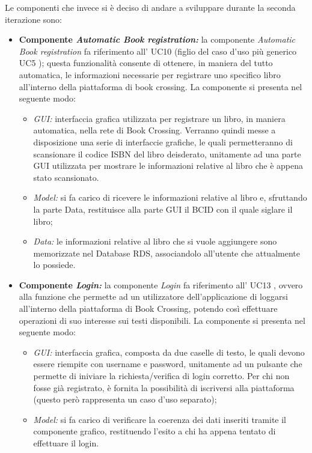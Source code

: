 Le componenti che invece si è deciso di andare a sviluppare durante la seconda iterazione sono: 
\begin{itemize}
	\item \textbf{Componente \textit{Automatic Book registration:}} la componente \textit{Automatic Book registration} fa riferimento all’ UC10
	(figlio del caso d'uso più generico UC5 
	); questa funzionalità consente di ottenere, in maniera del tutto automatica, le informazioni necessarie per registrare uno specifico libro all'interno della piattaforma di book crossing. La componente si presenta nel seguente modo:
	\begin{itemize}
		\item \textit{GUI:} interfaccia grafica utilizzata per registrare un libro, in maniera automatica, nella rete di Book Crossing. Verranno quindi messe a disposizione una serie di interfaccie grafiche, le quali permetteranno di scansionare il codice ISBN del libro deisderato, unitamente ad una parte GUI utilizzata per mostrare le informazioni relative al libro che è appena stato scansionato.
		\item \textit{Model:} si fa carico di ricevere le informazioni relative al libro e, sfruttando la parte Data, restituisce alla parte GUI il BCID con il quale siglare il libro;
		\item \textit{Data:} le informazioni relative al libro che si vuole aggiungere sono memorizzate nel Database RDS, associandolo all'utente che attualmente lo possiede. 
	\end{itemize}
	\item \textbf{Componente \textit{Login:}}  la componente \textit{Login} fa riferimento all’ UC13 
	, ovvero alla funzione che permette ad un utilizzatore dell'applicazione di loggarsi all'interno della piattaforma di Book Crossing, potendo così effettuare operazioni di suo interesse sui testi disponibili.
	La componente si presenta nel seguente modo:
	\begin{itemize}
		\item \textit{GUI:} interfaccia grafica, composta da due caselle di testo, le quali devono essere riempite con username e password, unitamente ad un pulsante che permette di iniviare la richiesta/verifica di login corretto. Per chi non fosse già registrato, è fornita la possibilità di iscriversi alla piattaforma (questo però rappresenta un caso d'uso separato);
		\item \textit{Model:} si fa carico di verificare la coerenza dei dati inseriti tramite il componente grafico, restituendo l'esito a chi ha appena tentato di effettuare il login.

\end{itemize}
\end{itemize}
